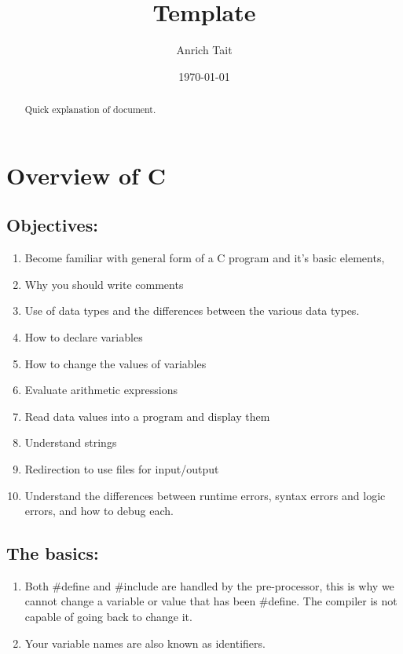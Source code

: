 \documentclass[12pt, letterpaper]{report}
\title{Template}
\author{Anrich Tait}
\date{\today}
\begin{document}
\restoregeometry %
\nopagecolor%

\begin{abstract}
	Quick explanation of document.
\end{abstract}
\tableofcontents

\chapter{Overview of C}
\section{Objectives:}
\begin{enumerate}
	\item Become familiar with general form of a C program and it's basic elements,
	\item Why you should write comments
	\item Use of data types and the differences between the various data types.
	\item How to declare variables
	\item How to change the values of variables
	\item Evaluate arithmetic expressions
	\item Read data values into a program and display them
	\item Understand strings
	\item Redirection to use files for input/output
	\item Understand the differences between runtime errors, syntax errors and logic errors, and how to debug each.
\end{enumerate}
\section{The basics:}
\begin{enumerate}
	\item Both \#define and \#include are handled by the pre-processor, this is
		why we cannot change a variable or value that has been \#define. The 
		compiler is not capable of going back to change it.
	\item Your variable names are also known as identifiers.
\end{enumerate}
\end{document}
